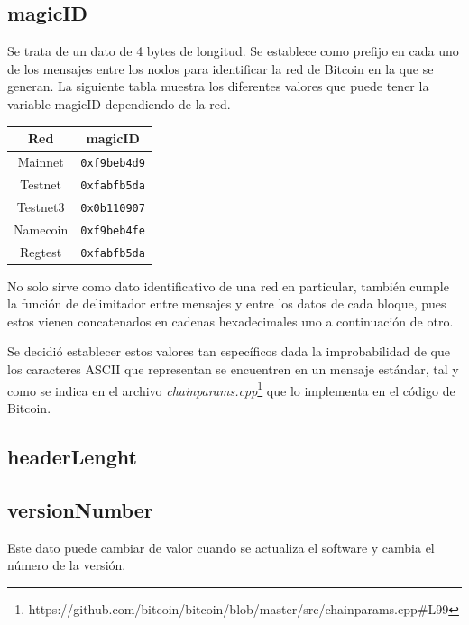 \documentclass{article}
\begin{document}
    \subsection{magicID}
    Se trata de un dato de 4 bytes de longitud. Se establece como prefijo en cada uno de los mensajes entre los nodos para identificar la red de Bitcoin en la que se generan. La siguiente tabla muestra los diferentes valores que puede tener la variable magicID dependiendo de la red.
    
    \begin{table}[H]
    \centering
    \begin{tabular}{| c | c |} 
        \hline
        Red & magicID \\
        \hline
        Mainnet & \texttt{0xf9beb4d9} \\
        \hline
        Testnet & \texttt{0xfabfb5da} \\
        \hline
        Testnet3 & \texttt{0x0b110907} \\
        \hline
        Namecoin & \texttt{0xf9beb4fe} \\
        \hline
        Regtest & \texttt{0xfabfb5da} \\
        \hline
    \end{tabular}
    \label{table:1}
    \end{table}
    
    No solo sirve como dato identificativo de una red en particular, también cumple la función de delimitador entre mensajes y entre los datos de cada bloque, pues estos vienen concatenados en cadenas hexadecimales uno a continuación de otro.
    
    Se decidió establecer estos valores tan específicos dada la improbabilidad de que los caracteres ASCII que representan se encuentren en un mensaje estándar, tal y como se indica en el archivo \textit{chainparams.cpp}\footnote{https://github.com/bitcoin/bitcoin/blob/master/src/chainparams.cpp\#L99} que lo implementa en el código de Bitcoin.
    
    \subsection{headerLenght}
    
    
    \subsection{versionNumber}
    Este dato puede cambiar de valor cuando se actualiza el software y cambia el número de la versión.
    
\end{document}
